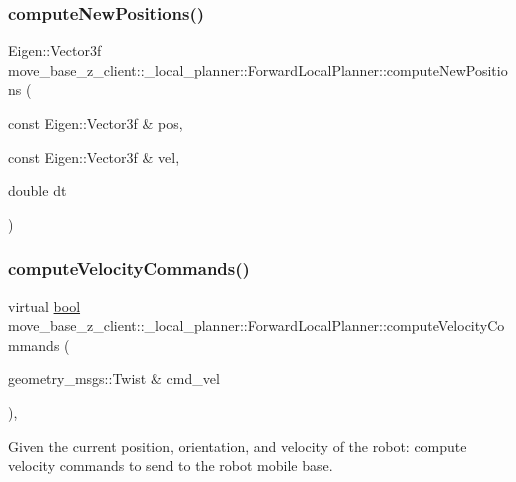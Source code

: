 \subsubsection{\texorpdfstring{compute\+New\+Positions()}{computeNewPositions()}}
{\footnotesize\ttfamily Eigen\+::\+Vector3f move\+\_\+base\+\_\+z\+\_\+client\+::\+\_\+local\+\_\+planner\+::\+Forward\+Local\+Planner\+::compute\+New\+Positions (\begin{DoxyParamCaption}\item[{const Eigen\+::\+Vector3f \&}]{pos,  }\item[{const Eigen\+::\+Vector3f \&}]{vel,  }\item[{double}]{dt }\end{DoxyParamCaption})\hspace{0.3cm}{\ttfamily [private]}}

\mbox{\label{classmove__base__z__client_1_1__local__planner_1_1ForwardLocalPlanner_a325225c8b34dd32bf2dde5b2502dce51}} 
\subsubsection{\texorpdfstring{compute\+Velocity\+Commands()}{computeVelocityCommands()}}
{\footnotesize\ttfamily virtual \hyperlink{classbool}{bool} move\+\_\+base\+\_\+z\+\_\+client\+::\+\_\+local\+\_\+planner\+::\+Forward\+Local\+Planner\+::compute\+Velocity\+Commands (\begin{DoxyParamCaption}\item[{geometry\+\_\+msgs\+::\+Twist \&}]{cmd\+\_\+vel }\end{DoxyParamCaption})\hspace{0.3cm}{\ttfamily [override]}, {\ttfamily [virtual]}}



Given the current position, orientation, and velocity of the robot\+: compute velocity commands to send to the robot mobile base. 



